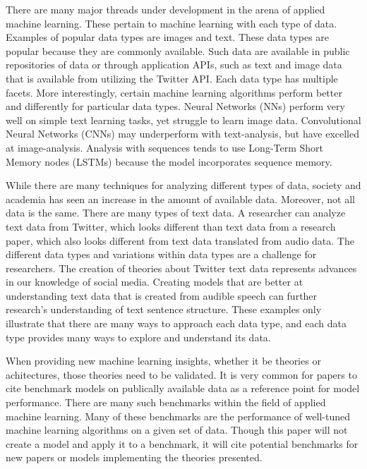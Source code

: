 There are many major threads under development in the arena of applied machine learning.  These pertain to machine learning with each type of data. Examples of popular data types are images and text. These data types are popular because they are commonly available.  Such data are available in public repositories of data or through application APIs, such as text and image data that is available from utilizing the Twitter API.  Each data type has multiple facets.  More interestingly, certain machine learning algorithms perform better and differently for particular data types.  Neural Networks (NNs) perform very well on simple text learning tasks, yet struggle to learn image data.  Convolutional Neural Networks (CNNs) may underperform with text-analysis, but have excelled at image-analysis.  Analysis with sequences tends to use Long-Term Short Memory nodes (LSTMs) because the model incorporates sequence memory.

While there are many techniques for analyzing different types of data, society and academia has seen an increase in the amount of available data.  Moreover, not all data is the same.  There are many types of text data.  A researcher can analyze text data from Twitter, which looks different than text data from a research paper, which also looks different from text data translated from audio data.  The different data types and variations within data types are a challenge for researchers.  The creation of theories about Twitter text data represents advances in our knowledge of social media.  Creating models that are better at understanding text data that is created from audible speech can further research's understanding of text sentence structure.  These examples only illustrate that there are many ways to approach each data type, and each data type provides many ways to explore and understand its data.

When providing new machine learning insights, whether it be theories or achitectures, those theories need to be validated.  It is very common for papers to cite benchmark models on publically available data as a reference point for model performance.  There are many such benchmarks within the field of applied machine learning.  Many of these benchmarks are the performance of well-tuned machine learning algorithms on a given set of data.  Though this paper will not create a model and apply it to a benchmark, it will cite potential benchmarks for new papers or models implementing the theories presented.


